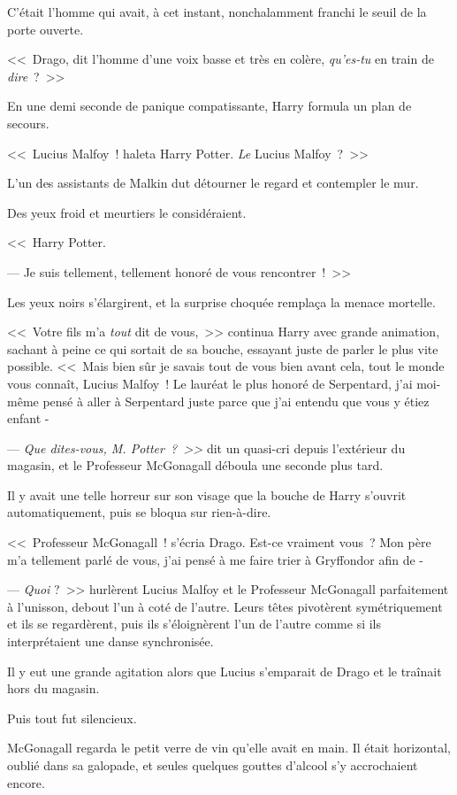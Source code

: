 C'était l'homme qui avait, à cet instant, nonchalamment franchi le seuil de la porte ouverte.

<<~Drago, dit l'homme d'une voix basse et très en colère, \emph{qu'es-tu} en train de \emph{dire}~?~>>

En une demi seconde de panique compatissante, Harry formula un plan de secours.

<<~Lucius Malfoy~! haleta Harry Potter. \emph{Le} Lucius Malfoy~?~>>

L'un des assistants de Malkin dut détourner le regard et contempler le mur.

Des yeux froid et meurtiers le considéraient.

<<~Harry Potter.

--- Je suis tellement, tellement honoré de vous rencontrer~!~>>

Les yeux noirs s'élargirent, et la surprise choquée remplaça la menace mortelle.

<<~Votre fils m'a \emph{tout} dit de vous,~>> continua Harry avec grande animation, sachant à peine ce qui sortait de sa bouche, essayant juste de parler le plus vite possible. <<~Mais bien sûr je savais tout de vous bien avant cela, tout le monde vous connaît, Lucius Malfoy~! Le lauréat le plus honoré de Serpentard, j'ai moi-même pensé à aller à Serpentard juste parce que j'ai entendu que vous y étiez enfant -

--- \emph{Que dites-vous, M. Potter~?~>>} dit un quasi-cri depuis l'extérieur du magasin, et le Professeur McGonagall déboula une seconde plus tard.

Il y avait une telle horreur sur son visage que la bouche de Harry s'ouvrit automatiquement, puis se bloqua sur rien-à-dire.

<<~Professeur McGonagall~! s'écria Drago. Est-ce vraiment vous~? Mon père m'a tellement parlé de vous, j'ai pensé à me faire trier à Gryffondor afin de -

--- \emph{Quoi} ?~>> hurlèrent Lucius Malfoy et le Professeur McGonagall parfaitement à l'unisson, debout l'un à coté de l'autre. Leurs têtes pivotèrent symétriquement et ils se regardèrent, puis ils s'éloignèrent l'un de l'autre comme si ils interprétaient une danse synchronisée.

Il y eut une grande agitation alors que Lucius s'emparait de Drago et le traînait hors du magasin.

Puis tout fut silencieux.

McGonagall regarda le petit verre de vin qu'elle avait en main. Il était horizontal, oublié dans sa galopade, et seules quelques gouttes d'alcool s'y accrochaient encore.

